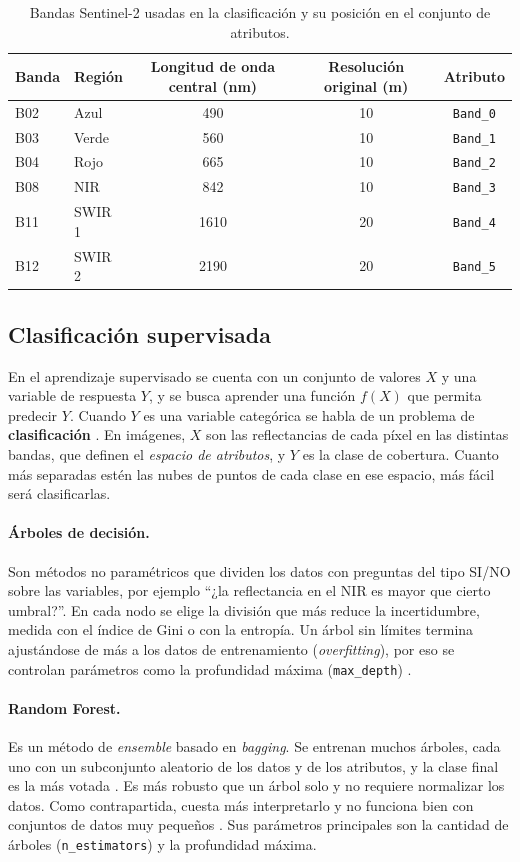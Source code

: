 \documentclass[11pt,letterpaper]{article}
\begin{document}
\begin{table}[H]
\centering
\caption{Bandas Sentinel-2 usadas en la clasificación y su posición en el conjunto de atributos.}
\label{tab:bandas}
\small
\begin{tabular}{@{}llccc@{}}
\toprule
Banda & Región & Longitud de onda central (nm) & Resolución original (m) & Atributo \\
\midrule
B02 & Azul      & 490  & 10 & \texttt{Band\_0} \\
B03 & Verde     & 560  & 10 & \texttt{Band\_1} \\
B04 & Rojo      & 665  & 10 & \texttt{Band\_2} \\
B08 & NIR       & 842  & 10 & \texttt{Band\_3} \\
B11 & SWIR 1    & 1610 & 20 & \texttt{Band\_4} \\
B12 & SWIR 2    & 2190 & 20 & \texttt{Band\_5} \\
\bottomrule
\end{tabular}
\end{table}

\subsection{Clasificación supervisada}
En el aprendizaje supervisado se cuenta con un conjunto de valores $X$ y una variable de respuesta $Y$, y
se busca aprender una función $f(X)$ que permita predecir $Y$. Cuando $Y$ es una variable categórica se habla
de un problema de \textbf{clasificación} \citep{gulich}. En imágenes, $X$ son las reflectancias de cada
píxel en las distintas bandas, que definen el \emph{espacio de atributos}, y $Y$ es la clase de cobertura.
Cuanto más separadas estén las nubes de puntos de cada clase en ese espacio, más fácil será clasificarlas.

\paragraph{Árboles de decisión.} Son métodos no paramétricos que dividen los datos con preguntas del tipo
SI/NO sobre las variables, por ejemplo ``¿la reflectancia en el NIR es mayor que cierto umbral?''. En cada
nodo se elige la división que más reduce la incertidumbre, medida con el índice de Gini o con la entropía.
Un árbol sin límites termina ajustándose de más a los datos de entrenamiento (\emph{overfitting}), por eso
se controlan parámetros como la profundidad máxima (\texttt{max\_depth}) \citep{gulich}.

\paragraph{Random Forest.} Es un método de \emph{ensemble} basado en \emph{bagging}. Se entrenan muchos
árboles, cada uno con un subconjunto aleatorio de los datos y de los atributos, y la clase final es la más
votada \citep{breiman2001}. Es más robusto que un árbol solo y no requiere normalizar los datos. Como
contrapartida, cuesta más interpretarlo y no funciona bien con conjuntos de datos muy pequeños
\citep{gulich}. Sus parámetros principales son la cantidad de árboles (\texttt{n\_estimators}) y la
profundidad máxima.
\end{document}
